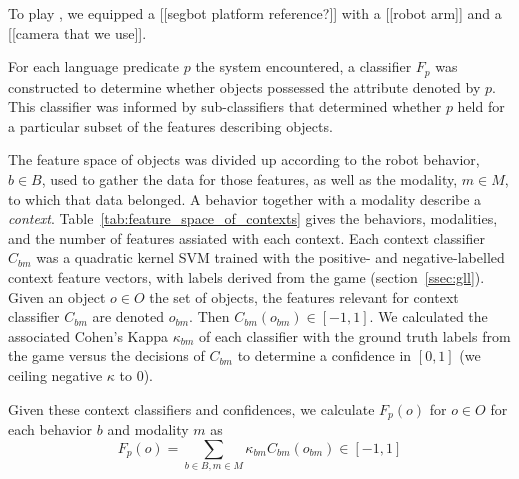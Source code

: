 To play \ispy, we equipped a [[segbot platform reference?]] with a [[robot arm]] and a [[camera that we use]].

For each language predicate $p$ the system encountered, a classifier $F_p$ was constructed to determine whether objects possessed the attribute denoted by $p$.
This classifier was informed by sub-classifiers that determined whether $p$ held for a particular subset of the features describing objects.

The feature space of objects was divided up according to the robot behavior, $b\in B$, used to gather the data for those features, as well as the modality, $m\in M$, to which that data belonged.
A behavior together with a modality describe a \textit{context}.
Table~\ref{tab:feature_space_of_contexts} gives the behaviors, modalities, and the number of features assiated with each context.
Each context classifier $C_{bm}$ was a quadratic kernel SVM trained with the positive- and negative-labelled context feature vectors, with labels derived from the \ispy game (section~\ref{ssec:gll}).
Given an object $o\in O$ the set of objects, the features relevant for context classifier $C_{bm}$ are denoted $o_{bm}$.
Then $C_{bm}(o_{bm})\in [-1,1]$.
We calculated the associated Cohen's Kappa $\kappa_{bm}$ of each classifier with the ground truth labels from the \ispy game versus the decisions of $C_{bm}$ to determine a confidence in $[0,1]$ (we ceiling negative $\kappa$ to $0$).

Given these context classifiers and confidences, we calculate $F_p(o)$ for $o\in O$ for each behavior $b$ and modality $m$ as
\begin{equation}
	F_p(o) = \sum_{b\in B,m\in M}{\kappa_{bm} C_{bm}(o_{bm})} \in [-1,1]
\end{equation}

